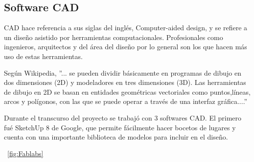 \subsection{Software CAD}

CAD hace referencia a sus siglas del inglés, Computer-aided design, y se refiere a un diseño asistido por herramientas computacionales. Profesionales como ingenieros, arquitectos y del área del diseño por lo general son los que hacen más uso de estas herramientas.

Según Wikipedia, ”... se pueden dividir básicamente en programas de dibujo en dos dimensiones (2D) y modeladores en tres dimensiones (3D). Las herramientas de dibujo en 2D se basan en entidades geométricas vectoriales como puntos,líneas, arcos y polígonos, con las que se puede operar a través de una interfaz gráfica....”

Durante el transcurso del proyecto se trabajó con 3 softwares CAD. El primero fué SketchUp 8 de Google, que permite fácilmente hacer bocetos de lugares y cuenta con una importante biblioteca de modelos para incluir en el diseño.

 ~\ref{fig:Fablabs}

